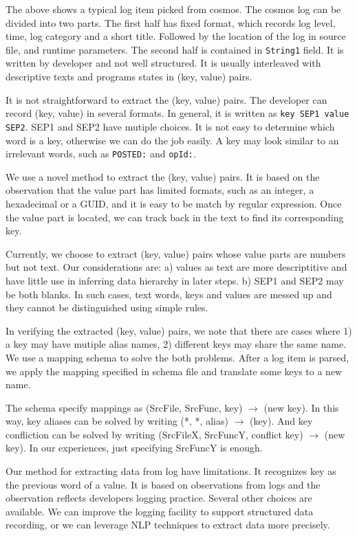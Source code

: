The above shows a typical log item picked from cosmos.  The
cosmos log can be divided into two parts. The first half has
fixed format, which records log level, time, log category
and a short title. Followed by the location of the log in
source file, and runtime parameters. The second half is
contained in \texttt{String1} field. It is written by
developer and not well structured. It is usually interleaved
with descriptive texts and programs states in (key, value)
pairs.

It is not straightforward to extract the (key, value) pairs.
The developer can record (key, value) in several formats. In
general, it is written as \texttt{key SEP1 value SEP2}. SEP1
and SEP2 have mutiple choices. It is not easy to determine
which word is a key, otherwise we can do the job easily. A
key may look similar to an irrelevant words, such as
\texttt{POSTED:} and \texttt{opId:}.

We use a novel method to extract the (key, value) pairs. It
is based on the observation that the value part has limited
formats, such as an integer, a hexadecimal or a GUID, and it
is easy to be match by regular expression. Once the value
part is located, we can track back in the text to find its
corresponding key.

Currently, we choose to extract (key, value) pairs whose
value parts are numbers but not text. Our considerations
are: a) values as text are more descriptitive and have
little use in inferring data hierarchy in later steps. b)
SEP1 and SEP2 may be both blanks. In such cases,
text words, keys and values are messed up and they cannot be
distinguished using simple rules.

In verifying the extracted (key, value) pairs, we note that
there are cases where 1) a key may have mutiple alias names,
2) different keys may share the same name. We use a mapping
schema to solve the both problems. After a log item is
parsed, we apply the mapping specified in schema file and
translate some keys to a new name.

The schema specify mappings as (SrcFile, SrcFunc, key) $\to$
(new key). In this way, key aliases can be solved by
writing (*, *, alias) $\to$ (key). And key confliction can
be solved by writing (SrcFileX, SrcFuncY, conflict key) $\to$
(new key). In our experiences, just specifying SrcFuncY is
enough.

Our method for extracting data from log have limitations. It
recognizes key as the previous word of a value. It is based
on observations from logs and the observation reflects
developers logging practice. Several other choices are
available. We can improve the logging facility to support
structured data recording, or we can leverage NLP techniques
to extract data more precisely.

